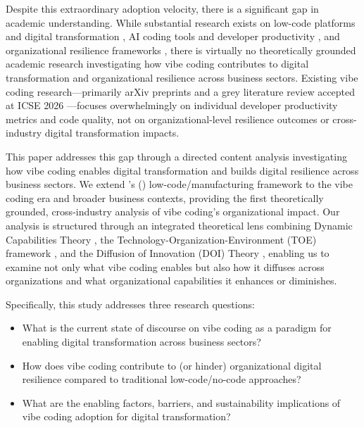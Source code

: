 \documentclass[preprint,12pt,authoryear]{elsarticle}
\begin{document}
Despite this extraordinary adoption velocity, there is a significant gap in academic understanding. While substantial research exists on low-code platforms and digital transformation \citep{Sanchis2020, Sahay2020, Cabot2020}, AI coding tools and developer productivity \citep{Ziegler2022, Imai2022}, and organizational resilience frameworks \citep{Sanchis2019, Browder2019}, there is virtually no theoretically grounded academic research investigating how vibe coding contributes to digital transformation and organizational resilience across business sectors. Existing vibe coding research---primarily arXiv preprints and a grey literature review accepted at ICSE 2026 \citep{Fawzy2025}---focuses overwhelmingly on individual developer productivity metrics and code quality, not on organizational-level resilience outcomes or cross-industry digital transformation impacts.

This paper addresses this gap through a directed content analysis \citep{Hsieh2005} investigating how vibe coding enables digital transformation and builds digital resilience across business sectors. We extend \citeauthor{Sanchis2020}'s (\citeyear{Sanchis2020}) low-code/manufacturing framework to the vibe coding era and broader business contexts, providing the first theoretically grounded, cross-industry analysis of vibe coding's organizational impact. Our analysis is structured through an integrated theoretical lens combining Dynamic Capabilities Theory \citep{Teece1997, Warner2019}, the Technology-Organization-Environment (TOE) framework \citep{Tornatzky1990}, and the Diffusion of Innovation (DOI) Theory \citep{Rogers2003}, enabling us to examine not only what vibe coding enables but also how it diffuses across organizations and what organizational capabilities it enhances or diminishes.

Specifically, this study addresses three research questions:

\begin{itemize}[leftmargin=2em]
  \item[\textbf{RQ1:}] What is the current state of discourse on vibe coding as a paradigm for enabling digital transformation across business sectors?
  \item[\textbf{RQ2:}] How does vibe coding contribute to (or hinder) organizational digital resilience compared to traditional low-code/no-code approaches?
  \item[\textbf{RQ3:}] What are the enabling factors, barriers, and sustainability implications of vibe coding adoption for digital transformation?
\end{itemize}
\end{document}
